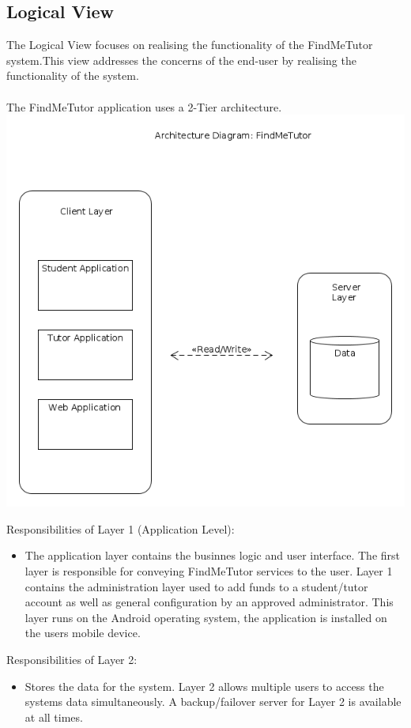 \documentclass[12pt]{article}
\begin{document}
\pagebreak
\subsection{Logical View}
The Logical View focuses on realising the functionality of the FindMeTutor system.This view addresses the concerns of the end-user by realising the functionality of the system.\\\\
The FindMeTutor application uses a 2-Tier architecture.\\
\includegraphics[width=140mm]{./architecture_diagram.png}

Responsibilities of Layer 1 (Application Level):
\begin{itemize}
\item The application layer contains the businnes logic and user interface. The first layer is responsible for conveying FindMeTutor services to the user. Layer 1 contains the administration layer used to add funds to a student/tutor account as well as general configuration by an approved administrator. This layer runs on the Android operating system, the application is installed on the users mobile device.
\end{itemize}

Responsibilities of Layer 2:
\begin{itemize}
\item Stores the data for the system. Layer 2 allows multiple users to access the systems data simultaneously. A backup/failover server for Layer 2 is available at all times.
\end{itemize}
\end{document}
